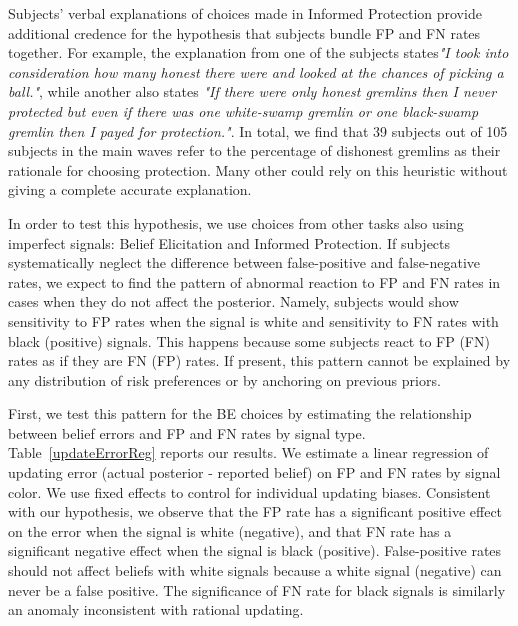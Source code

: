 \documentclass[12pt,a4paper]{article}
\begin{document}
Subjects' verbal explanations of choices made in Informed Protection provide additional credence for the hypothesis that subjects bundle FP and FN rates together. For example, the explanation from one of the subjects states\textit{"I took into consideration how many honest there were and looked at the chances of picking a ball."}, while another also states \textit{"If there were only honest gremlins then I never protected but even if there was one white-swamp gremlin or one black-swamp gremlin then I payed for protection."}. In total, we find that 39 subjects out of 105 subjects in the main waves refer to the percentage of dishonest gremlins as their rationale for choosing protection. Many other could rely on this heuristic without giving a complete accurate explanation.

In order to test this hypothesis, we use choices from other tasks also using imperfect signals: Belief Elicitation and Informed Protection. If subjects systematically neglect the difference between false-positive and false-negative rates, we expect to find the pattern of abnormal reaction to FP and FN rates in cases when they do not affect the posterior. Namely, subjects would show sensitivity to FP rates when the signal is white and sensitivity to FN rates with black (positive) signals. This happens because some subjects react to FP (FN) rates as if they are FN (FP) rates. If present, this pattern cannot be explained by any distribution of risk preferences or by anchoring on previous priors.

First, we test this pattern for the BE choices by estimating the relationship between belief errors and FP and FN rates by signal type. Table~\ref{updateErrorReg} reports our results. We estimate a linear regression of updating error (actual posterior - reported belief) on FP and FN rates by signal color. We use fixed effects to control for individual updating biases. Consistent with our hypothesis, we observe that the FP rate has a significant positive effect on the error when the signal is white (negative), and that FN rate has a significant negative effect when the signal is black (positive). False-positive rates should not affect beliefs with white signals because a white signal (negative) can never be a false positive. The significance of FN rate for black signals is similarly an anomaly inconsistent with rational updating. 

\end{document}
